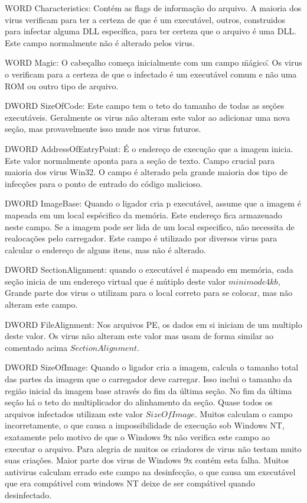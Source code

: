 WORD Characteristics: Contém as flags de informação do arquivo. A maioria dos virus
 verificam para ter a certeza de que é um executável, outros, construidos para infectar
 alguma DLL específica, para ter certeza que o arquivo é uma DLL. Este campo normalmente
 não é alterado pelos virus.

WORD Magic: O cabeçalho começa inicialmente com um campo \"mágico\". Os virus o verificam
 para a certeza de que o infectado é um executável comum e não uma ROM ou outro tipo de arquivo.

DWORD SizeOfCode: Este campo tem o teto do tamanho de todas as seções executáveis.
 Geralmente os virus não alteram este valor ao adicionar uma nova seção, mas provavelmente
 isso mude nos virus futuros.

DWORD AddressOfEntryPoint:  É o endereço  de execução que a imagem inicia. Este valor
 normalmente aponta para a seção de texto. Campo crucial para maioria dos virus Win32.
 O campo é alterado pela grande maioria dos tipo de infecções para o ponto de entrado do código malicioso.
 
DWORD ImageBase: Quando o ligador cria p executável, assume que a imagem é mapeada em um local espécifico da memória.
 Este endereço fica armazenado neste campo. Se a imagem pode ser lida de um local especifico, não necessita de realocações pelo carregador.
 Este campo é utilizado por diversos virus para calcular o endereço de alguns itens, mas não é alterado.

DWORD SectionAlignment: quando o executável é mapeado em memória, cada seção inicia de um endereço virtual que é mútiplo deste valor \(minimo de 4 kb\),  Grande parte
 dos virus o utilizam para o local correto para se colocar, mas não alteram este campo.

DWORD FileAlignment: Nos arquivos PE, os dados em si iniciam de um multiplo deste valor. Os virus não alteram este valor mas usam de forma similar ao comentado acima \(SectionAlignment\).

DWORD SizeOfImage: Quando o ligador cria a imagem, calcula o tamanho total das partes da imagem que o carregador deve carregar.
 Isso inclui o tamanho da região inicial da imagem base através do fim da última seção. No fim da última seção há o teto do multiplicador do alinhamento da seção.
 Quase todos os arquivos infectados utilizam este valor \(SizeOfImage\). Muitos calculam o campo incorretamente, o que causa a impossibilidade de execução sob Windows NT,
 exatamente pelo motivo de que o Windows 9x não verifica este campo ao executar o arquivo. Para alegria de muitos os criadores de virus não testam muito suas criações. Maior parte
 dos virus de Windows 9x contém esta falha. Muitos antivirus calculam errado este campo na desinfecção, o que causa um executável que era compátivel com windows NT deixe de ser compátivel 
 quando desinfectado.

